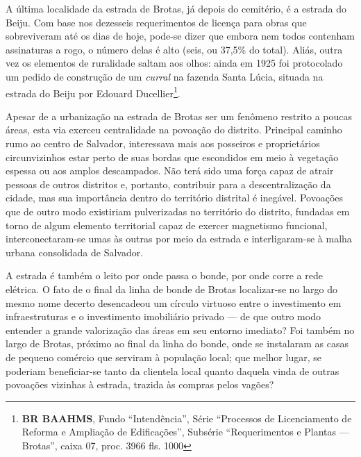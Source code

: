 A última localidade da estrada de Brotas, já depois do cemitério, é a estrada do Beiju. Com base nos dezesseis requerimentos de licença para obras que sobreviveram até os dias de hoje, pode-se dizer que embora nem todos contenham assinaturas a rogo, o número delas é alto (seis, ou 37,5\% do total). Aliás, outra vez os elementos de ruralidade saltam aos olhos: ainda em 1925 foi protocolado um pedido de construção de um \textit{curral} na fazenda Santa Lúcia, situada na estrada do Beiju por Edouard Ducellier\footnote{\textbf{BR BAAHMS}, Fundo ``Intendência'', Série ``Processos de Licenciamento de Reforma e Ampliação de Edificações'', Subsérie ``Requerimentos e Plantas --- Brotas'', caixa 07, proc. 3966 fls. 1000}.


Apesar de a urbanização na estrada de Brotas ser um fenômeno restrito a poucas áreas, esta via exerceu centralidade na povoação do distrito. Principal caminho rumo ao centro de Salvador, interessava mais aos posseiros e proprietários circunvizinhos estar perto de suas bordas que escondidos em meio à vegetação espessa ou aos amplos descampados. Não terá sido uma força capaz de atrair pessoas de outros distritos e, portanto, contribuir para a descentralização da cidade, mas sua importância dentro do território distrital é inegável. Povoações que de outro modo existiriam pulverizadas no território do distrito, fundadas em torno de algum elemento territorial capaz de exercer magnetismo funcional, interconectaram-se umas às outras por meio da estrada e interligaram-se à malha urbana consolidada de Salvador.

A estrada é também o leito por onde passa o bonde, por onde corre a rede elétrica. O fato de o final da linha de bonde de Brotas localizar-se no largo do mesmo nome decerto desencadeou um círculo virtuoso entre o investimento em infraestruturas e o investimento imobiliário privado --- de que outro modo entender a grande valorização das áreas em seu entorno imediato? Foi também no largo de Brotas, próximo ao final da linha do bonde, onde se instalaram as casas de pequeno comércio que serviram à população local; que melhor lugar, se poderiam beneficiar-se tanto da clientela local quanto daquela vinda de outras povoações vizinhas à estrada, trazida às compras pelos vagões?

